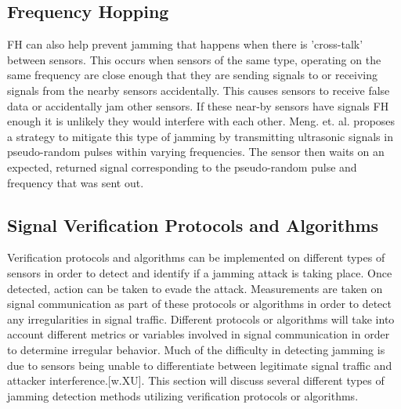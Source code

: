 \documentclass[conference]{IEEEtran}
\begin{document}
\subsection{Frequency Hopping}
\indent FH can also help prevent jamming that happens when there is 'cross-talk' between sensors. This occurs when sensors of the same type, operating on the same frequency are close enough that they are sending signals to or receiving signals from the nearby sensors accidentally\cite{3}. This causes sensors to receive false data or accidentally jam other sensors. If these near-by sensors have signals FH enough it is unlikely they would interfere with each other. Meng. et. al. proposes a strategy to mitigate this type of jamming by transmitting ultrasonic signals in pseudo-random pulses within varying frequencies. The sensor then waits on an expected, returned signal corresponding to the pseudo-random pulse and frequency that was sent out\cite{3}.
\subsection{Signal Verification Protocols and Algorithms}
Verification protocols and algorithms can be implemented on different types of sensors in order to detect and identify if a jamming attack is taking place. Once detected, action can be taken to evade the attack. Measurements are taken on signal communication as part of these protocols or algorithms in order to detect any irregularities in signal traffic. Different protocols or algorithms will take into account different metrics or variables involved in signal communication in order to determine irregular behavior\cite{7}. Much of the difficulty in detecting jamming is due to sensors being unable to differentiate between legitimate signal traffic and attacker interference.[w.XU]. This section will discuss several different types of jamming detection methods utilizing verification protocols or algorithms. 
\end{document}
